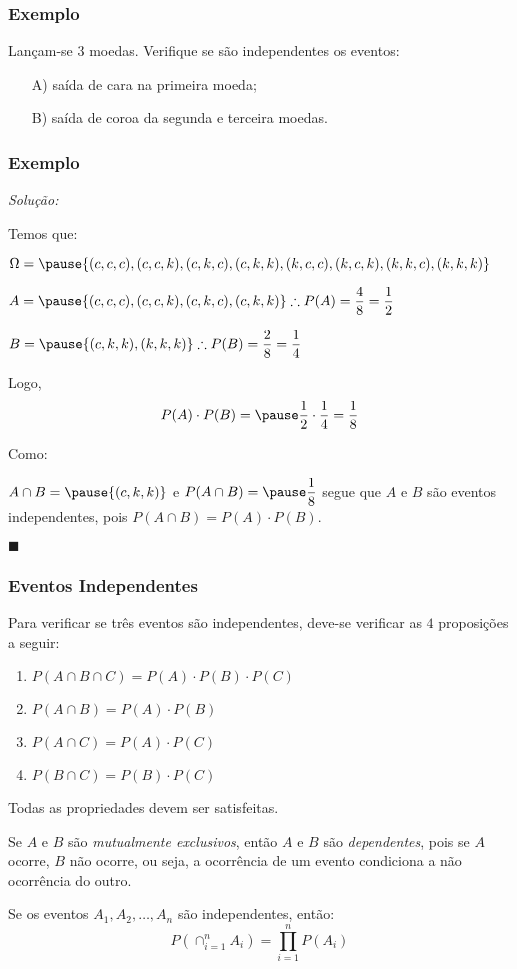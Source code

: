 \documentclass[hyperref={pdfpagelabels=false}]{beamer}
\begin{document}
\begin{frame}
\frametitle{Exemplo}

Lançam-se $3$ moedas. Verifique se são independentes os eventos:
\begin{itemize}
	\item[A)] saída de cara na primeira moeda;
	\item[B)] saída de coroa da segunda e terceira moedas. 
\end{itemize}

\end{frame}

\begin{frame}
\frametitle{Exemplo}

{\it Solução:}

Temos que:

$\Omega = \pause \{ (c,c,c), (c,c,k), (c,k,c), (c,k,k), (k,c,c), (k,c,k), (k,k,c), (k,k,k) \}$

$A = \pause \{ (c,c,c), (c,c,k), (c,k,c), (c,k,k) \} \therefore P(A) = \displaystyle \frac{4}{8} = \displaystyle \frac{1}{2}$

$B = \pause \{ (c,k,k), (k,k,k) \} \therefore P(B) = \displaystyle \frac{2}{8} = \displaystyle \frac{1}{4}$

Logo,
$$P(A)\cdot P(B) = \pause \frac{1}{2}\cdot \frac{1}{4} = \frac{1}{8}$$

Como:

$A \cap B = \pause \{ (c,k,k)\}$ e $P(A \cap B) = \pause \displaystyle \frac{1}{8}$ segue que $A$ e $B$ são eventos independentes, pois $P(A \cap B) =P(A)\cdot P(B)$.

\begin{flushright}
	$\blacksquare$
\end{flushright}
\end{frame}

\begin{frame}
\frametitle{Eventos Independentes}

Para verificar se três eventos são independentes, deve-se verificar as $4$ proposições a seguir:

\pause
\begin{enumerate}
	\item $P(A \cap B \cap C) = P(A) \cdot P(B) \cdot P(C)$
	\pause
	\item $P(A \cap B) = P(A) \cdot P(B)$
	\pause
	\item $P(A \cap C) = P(A) \cdot P(C)$
	\pause
	\item $P(B \cap C) = P(B) \cdot P(C)$
	\pause
\end{enumerate}

Todas as propriedades devem ser satisfeitas.

\pause
Se $A$ e $B$ são {\it mutualmente exclusivos}, então $A$ e $B$ são {\it dependentes}, pois se $A$ ocorre, $B$ não ocorre, ou seja, a ocorrência de um evento condiciona a não ocorrência do outro.

\pause
Se os eventos $A_1,A_2,\dots,A_n$ são independentes, então:
$$P\left( \displaystyle \cap_{i=1}^{n} A_i \right) = \prod_{i=1}^{n} P(A_i)$$
\end{frame}
\end{document}
